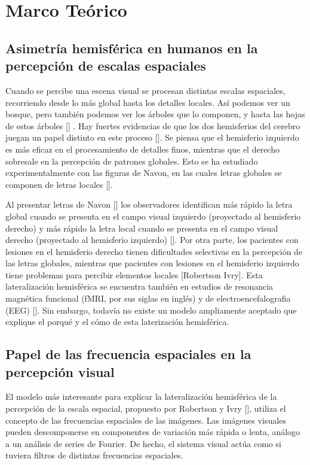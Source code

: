 \chapter{Marco Te\'orico}\label{chapter:theory}

\section{Asimetría hemisférica en humanos en la percepción de escalas espaciales}

Cuando se percibe una escena visual se procesan distintas escalas espaciales, recorriendo desde lo más global hasta los detalles locales.  Así podemos ver un bosque, pero también podemos ver los árboles que lo componen, y hasta las hojas de estos árboles [\cite{wagemans_perception_2014}] . Hay fuertes evidencias de que los dos hemisferios del cerebro juegan un papel distinto en este proceso [\cite{flevaris_spatial_2016}]. Se piensa que el hemisferio izquierdo es más eficaz en el procesamiento de detalles finos, mientras que el derecho sobresale en la percepción de patrones globales. Esto se ha estudiado experimentalmente con las figuras de Navon, en las cuales letras globales se componen de letras locales [\cite{navon_forest_1977}]. 

Al presentar letras de Navon [\cite{navon_forest_1977}] los observadores identifican más rápido la letra global cuando se presenta en el campo visual izquierdo (proyectado al hemisferio derecho) y más rápido la letra local cuando se presenta en el campo visual derecho (proyectado al hemisferio izquierdo) [\cite{navon_forest_1977}]. Por otra parte, los pacientes con lesiones en el hemisferio derecho tienen dificultades selectivas en la percepción de las letras globales, mientras que pacientes con lesiones en el hemisferio izquierdo tiene problemas para percibir elementos locales [Robertson Ivry]. Esta lateralización hemisférica se encuentra también en estudios de resonancia magnética funcional (fMRI, por sus siglas en ingl\'es) \cite{han_hemispheric_2002} y de electroencefalografia (EEG) [\cite{iglesias-fuster_asynchronous_2015}]. Sin embargo, todavía no existe un modelo ampliamente aceptado que explique el porqué y el cómo de esta laterización hemisférica.

\section{Papel de las frecuencia espaciales en la percepción visual}

El modelo más interesante para explicar la lateralización hemisférica de la percepción de la escala espacial, propuesto por Robertson y Ivry [\cite{robertson_hemispheric_2000}], utiliza el concepto de las frecuencias espaciales de las imágenes. Las imágenes visuales pueden descomponerse en componentes de variación más rápida o lenta, análogo a un análisis de series de Fourier. De hecho, el sistema visual actúa como si tuviera filtros de distintas frecuencias espaciales.

